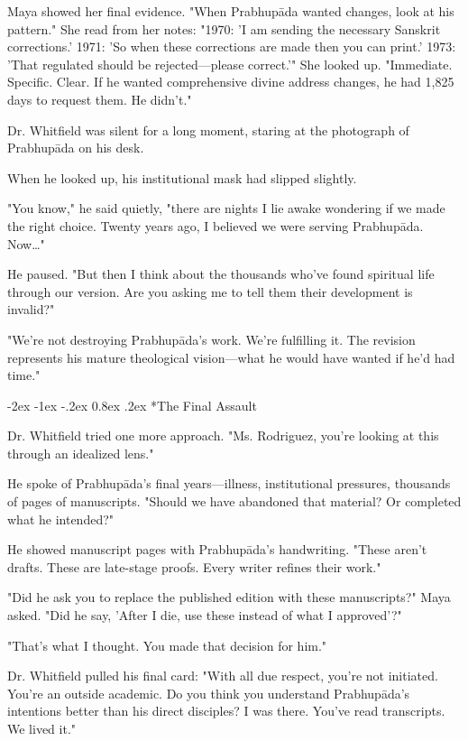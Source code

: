 \documentclass[12pt,twoside]{book}
\makeatletter
\let\oldsubsection\subsection
\renewcommand{\subsection}[1]{\needspace{3\baselineskip}\oldsubsection{#1}}
\renewcommand\subsection{\@startsection{subsection}{2}{\z@}%
{-2ex \@plus -1ex \@minus -.2ex}%
{0.8ex \@plus .2ex}%
{\normalfont\large\bfseries}}
\makeatother
\begin{document}
Maya showed her final evidence. "When Prabhupāda wanted changes, look at his pattern." She read from her notes: "1970: 'I am sending the necessary Sanskrit corrections.' 1971: 'So when these corrections are made then you can print.' 1973: 'That regulated should be rejected—please correct.'" She looked up. "Immediate. Specific. Clear. If he wanted comprehensive divine address changes, he had 1,825 days to request them. He didn't."

Dr. Whitfield was silent for a long moment, staring at the photograph of Prabhupāda on his desk.

When he looked up, his institutional mask had slipped slightly.

"You know," he said quietly, "there are nights I lie awake wondering if we made the right choice. Twenty years ago, I believed we were serving Prabhupāda. Now\ldots{}"

He paused. "But then I think about the thousands who've found spiritual life through our version. Are you asking me to tell them their development is invalid?"

"We're not destroying Prabhupāda's work. We're fulfilling it. The revision represents his mature theological vision—what he would have wanted if he'd had time."


\vspace{0.1cm}
\subsection*{The Final Assault}

Dr. Whitfield tried one more approach. "Ms. Rodriguez, you're looking at this through an idealized lens."

He spoke of Prabhupāda's final years—illness, institutional pressures, thousands of pages of manuscripts. "Should we have abandoned that material? Or completed what he intended?"

He showed manuscript pages with Prabhupāda's handwriting. "These aren't drafts. These are late-stage proofs. Every writer refines their work."

"Did he ask you to replace the published edition with these manuscripts?" Maya asked. "Did he say, 'After I die, use these instead of what I approved'?"

"That's what I thought. You made that decision for him."

Dr. Whitfield pulled his final card: "With all due respect, you're not initiated. You're an outside academic. Do you think you understand Prabhupāda's intentions better than his direct disciples? I was there. You've read transcripts. We lived it."
\end{document}
